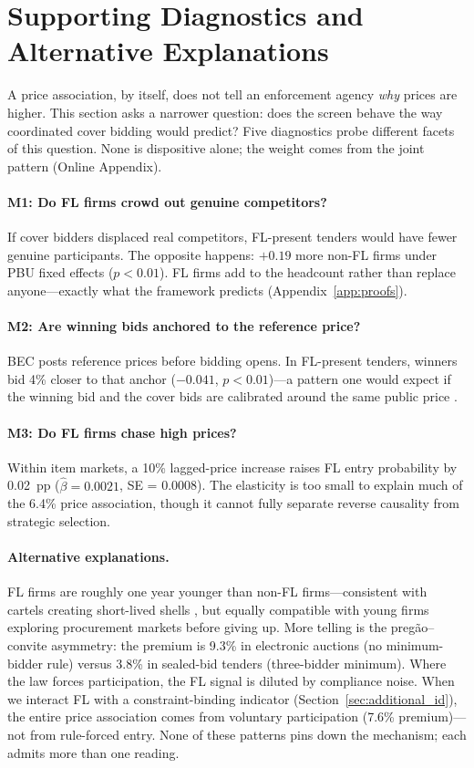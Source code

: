 \section{Supporting Diagnostics and Alternative Explanations}
\label{sec:mechanisms}

A price association, by itself, does not tell an enforcement agency
\emph{why} prices are higher. This section asks a narrower question:
does the screen behave the way coordinated cover bidding would
predict? Five diagnostics probe different facets of this question.
None is dispositive alone; the weight comes from the joint pattern
(Online Appendix).

\paragraph{M1: Do FL firms crowd out genuine competitors?}
If cover bidders displaced real competitors, FL-present tenders
would have fewer genuine participants. The opposite happens: $+0.19$
more non-FL firms under PBU fixed effects ($p < 0.01$). FL firms
add to the headcount rather than replace anyone---exactly what the
framework predicts (Appendix~\ref{app:proofs}).

\paragraph{M2: Are winning bids anchored to the reference price?}
BEC posts reference prices before bidding opens. In FL-present
tenders, winners bid 4\% closer to that anchor ($-0.041$,
$p < 0.01$)---a pattern one would expect if the winning bid and
the cover bids are calibrated around the same public price
\citep{marshall2012economics}.

\paragraph{M3: Do FL firms chase high prices?}
Within item markets, a 10\% lagged-price increase raises FL entry
probability by 0.02~pp ($\hat{\beta} = 0.0021$, SE = 0.0008). The
elasticity is too small to explain much of the 6.4\% price
association, though it cannot fully separate reverse causality from
strategic selection.

\paragraph{Alternative explanations.}
FL firms are roughly one year younger than non-FL firms---consistent
with cartels creating short-lived shells
\citep{marshall2012economics}, but equally compatible with young
firms exploring procurement markets before giving up. More telling
is the preg\~ao--convite asymmetry: the premium is 9.3\% in
electronic auctions (no minimum-bidder rule) versus 3.8\% in
sealed-bid tenders (three-bidder minimum). Where the law forces
participation, the FL signal is diluted by compliance noise. When
we interact FL with a constraint-binding indicator
(Section~\ref{sec:additional_id}), the entire price association
comes from voluntary participation (7.6\% premium)---not from
rule-forced entry. None of these patterns pins down the mechanism;
each admits more than one reading.


